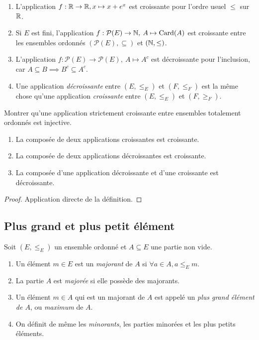 \begin{exemple}
\begin{enumerate}
\item L'application $f : \mathbb{R}\to \mathbb{R}, x\mapsto x+e^x$ est croissante pour l'ordre usuel $\leq $ sur $\mathbb{R}$.
\item Si $E$ est fini, l'application $f : \mathcal P(E) \to \mathbb{N}, \: A\mapsto \operatorname{Card}(A)$ est croissante entre les ensembles ordonnés $(\mathcal P(E), \subseteq)$ et $(\mathbb{N}, \leq)$.
\item L'application $f : \mathcal P(E) \to \mathcal P(E), \: A\mapsto A^c$ est décroissante pour l'inclusion, car $A\subseteq B \implies B^c\subseteq A^c$.
\item Une application \emph{décroissante} entre $(E,\leq_E)$ et $(F,\leq_F)$ est la même chose qu'une application \emph{croissante} entre $(E,\leq_E)$ et $(F,\geq_F)$.
\end{enumerate}
\end{exemple}

\begin{exercice}
Montrer qu'une application strictement croissante entre ensembles totalement ordonnés est injective.
\end{exercice}


\begin{proposition}
\begin{enumerate}
\item La composée de deux applications croissantes est croissante.
\item La composée de deux applications décroissantes est croissante.
\item La composée d'une application décroissante et d'une croissante est décroissante.
\end{enumerate}
\end{proposition}

\begin{proof}
Application directe de la définition.
\end{proof}

\subsection{Plus grand et plus petit élément}
\begin{definition}
Soit $(E,\leq_E)$ un ensemble ordonné et $A\subseteq E$ une partie non vide.
\begin{enumerate}
\item Un élément $m\in E$ est un \emph{majorant} de $A$ si $\forall a\in A, a\leq_E m$.
\item La partie $A$ est \emph{majorée} si elle possède des majorants.
\item Un élément $m\in A$ qui est un majorant de $A$ est appelé un \emph{plus grand élément de $A$}, ou \emph{maximum} de $A$.
\item On définit de même les \emph{minorants}, les parties minorées et les plus petits éléments.
\end{enumerate}
\end{definition}

